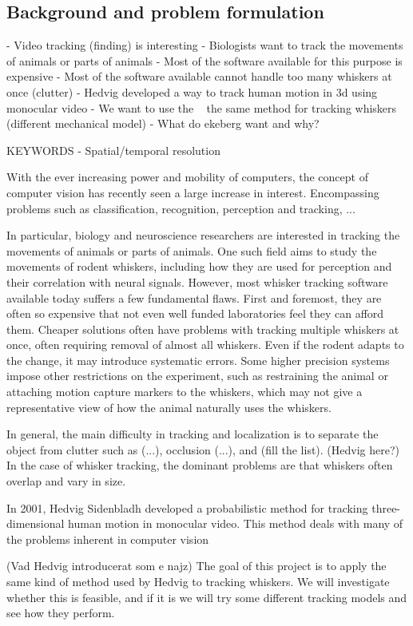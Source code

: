 \subsection{Background and problem formulation}

- Video tracking (finding) is interesting
- Biologists want to track the movements of animals or parts of animals
- Most of the software available for this purpose is expensive
- Most of the software available cannot handle too many whiskers at once (clutter)
- Hedvig developed a way to track human motion in 3d using monocular video
- We want to use the ~ the same method for tracking whiskers (different mechanical model)
- What do ekeberg want and why?

KEYWORDS
- Spatial/temporal resolution

With the ever increasing power and mobility of computers, the concept of computer vision has recently seen a large increase in interest. Encompassing problems such as classification, recognition, perception and tracking, ...

In particular, biology and neuroscience researchers are interested in tracking the movements of animals or parts of animals. One such field aims to study the movements of rodent whiskers, including how they are used for perception and their correlation with neural signals. However, most whisker tracking software available today suffers a few fundamental flaws. First and foremost, they are often so expensive that not even well funded laboratories feel they can afford them. Cheaper solutions often have problems with tracking multiple whiskers at once, often requiring removal of almost all whiskers. Even if the rodent adapts to the change, it may introduce systematic errors. Some higher precision systems impose other restrictions on the experiment, such as restraining the animal or attaching motion capture markers to the whiskers, which may not give a representative view of how the animal naturally uses the whiskers.

In general, the main difficulty in tracking and localization is to separate the object from clutter such as (...), occlusion (...), and (fill the list). (Hedvig here?) In the case of whisker tracking, the dominant problems are that whiskers often overlap and vary in size.

In 2001, Hedvig Sidenbladh developed a probabilistic method for tracking three-dimensional human motion in monocular video. This method deals with many of the problems inherent in computer vision

(Vad Hedvig introducerat som e najz) The goal of this project is to apply the same kind of method used by Hedvig to tracking whiskers. We will investigate whether this is feasible, and if it is we will try some different tracking models and see how they perform.

